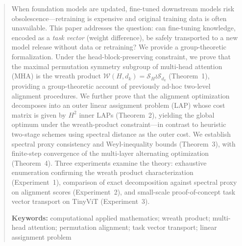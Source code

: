 \begin{abstract}
\noindent
When foundation models are updated, fine-tuned downstream models risk obsolescence---retraining is expensive and original training data is often unavailable. This paper addresses the question: can fine-tuning knowledge, encoded as a \emph{task vector} (weight difference), be safely transported to a new model release without data or retraining? We provide a group-theoretic formalization. Under the head-block-preserving constraint, we prove that the maximal permutation symmetry subgroup of multi-head attention (MHA) is the wreath product $\mathcal{W}(H,d_k)=\mathcal{S}_H\wr\mathcal{S}_{d_k}$ (Theorem~1), providing a group-theoretic account of previously ad-hoc two-level alignment procedures. We further prove that the alignment optimization decomposes into an outer linear assignment problem (LAP) whose cost matrix is given by $H^2$ inner LAPs (Theorem~2), yielding the global optimum under the wreath-product constraint---in contrast to heuristic two-stage schemes using spectral distance as the outer cost. We establish spectral proxy consistency and Weyl-inequality bounds (Theorem~3), with finite-step convergence of the multi-layer alternating optimization (Theorem~4). Three experiments examine the theory: exhaustive enumeration confirming the wreath product characterization (Experiment~1), comparison of exact decomposition against spectral proxy on alignment scores (Experiment~2), and small-scale proof-of-concept task vector transport on TinyViT (Experiment~3).

\vspace{0.3em}
\noindent\textbf{Keywords:} computational applied mathematics; wreath product; multi-head attention; permutation alignment; task vector transport; linear assignment problem
\end{abstract}
